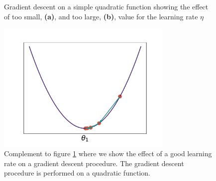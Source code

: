 \begin{figure}[H]
\centering
\hspace*{-0.9in}
\caption{Gradient descent on a simple quadratic function showing the effect of too small, \textbf{(a)}, and too large, \textbf{(b)}, value for the learning rate $\eta$}\label{fig:badgd}
\end{figure}

\begin{figure}[H]
\centering
	\includegraphics[width=0.75\textwidth]{../figures/gd_good.pdf}
\caption{Complement to figure \ref{fig:badgd} where we show the effect of a good learning rate on a gradient descent procedure. The gradient descent procedure is performed on a quadratic function.}\label{fig:goodgd}
\end{figure}

